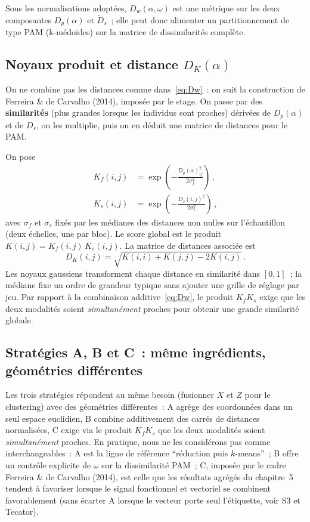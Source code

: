 \documentclass[11pt,a4paper]{article}
\newcommand{\Dw}{D_w}
\newcommand{\DK}{D_K}
\newcommand{\Dp}{D_p}
\begin{document}
Sous les normalisations adoptées, $\Dw(\alpha,\omega)$ est une métrique sur les
deux composantes $\Dp(\alpha)$ et $\tilde{D}_s$~; elle peut donc alimenter un
partitionnement de type PAM (k-médoïdes) sur la matrice de dissimilarités complète.

\subsection{Noyaux produit et distance $\DK(\alpha)$}
On ne combine pas les distances comme dans~\eqref{eq:Dw}~: on suit la
construction de Ferreira \& de Carvalho (2014), imposée par le stage. On passe
par des \textbf{similarités} (plus grandes lorsque les individus sont proches)
dérivées de $\Dp(\alpha)$ et de $D_s$, on les multiplie, puis on en déduit une
matrice de distances pour le PAM.

On pose
\begin{align}
  K_f(i,j) &= \exp\!\left(-\frac{\Dp(\alpha)_{ij}^2}{2\sigma_f^2}\right)\,, \\
  K_s(i,j) &= \exp\!\left(-\frac{D_s(i,j)^2}{2\sigma_s^2}\right)\,,
\end{align}
avec $\sigma_f$ et $\sigma_s$ fixés par les médianes des distances non nulles sur
l'échantillon (deux échelles, une par bloc). Le score global est le produit
$K(i,j)=K_f(i,j)\,K_s(i,j)$. La matrice de distances associée est
\begin{equation}
  \label{eq:DK}
  \DK(i,j) = \sqrt{K(i,i)+K(j,j)-2K(i,j)}\,.
\end{equation}
Les noyaux gaussiens transforment chaque distance en similarité dans $[0,1]$~;
la médiane fixe un ordre de grandeur typique sans ajouter une grille de réglage
par jeu. Par rapport à la combinaison additive~\eqref{eq:Dw}, le produit $K_fK_s$
exige que les deux modalités soient \emph{simultanément} proches pour obtenir
une grande similarité globale.

\subsection{Stratégies A, B et C~: même ingrédients, géométries différentes}

\noindent
Les trois stratégies répondent au même besoin (fusionner $X$ et $Z$ pour le clustering) avec des géométries différentes~: A agrège des coordonnées dans un seul espace euclidien, B combine additivement des carrés de distances normalisées, C exige via le produit $K_f K_s$ que les deux modalités soient \emph{simultanément} proches. En pratique, nous ne les considérons pas comme interchangeables~: A est la ligne de référence ``réduction puis $k$-means''~; B offre un contrôle explicite de $\omega$ sur la dissimilarité PAM~; C, imposée par le cadre Ferreira \& de Carvalho (2014), est celle que les résultats agrégés du chapitre~5 tendent à favoriser lorsque le signal fonctionnel et vectoriel se combinent favorablement (sans écarter A lorsque le vecteur porte seul l'étiquette, voir S3 et Tecator).
\end{document}
